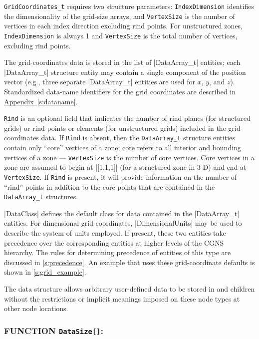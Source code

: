 \texttt{GridCoordinates\_t} requires two structure parameters:
\texttt{IndexDimension} identifies the dimensionality of the grid-size
arrays, and \texttt{VertexSize} is the number of vertices in each index
direction excluding rind points.
For unstructured zones, \texttt{IndexDimension} is always 1 and
\texttt{VertexSize} is the total number of vertices, excluding rind
points.

The grid-coordinates data is stored in the list of |DataArray_t| entities;
each |DataArray_t| structure entity may contain a single component of
the position vector (e.g., three separate |DataArray_t| entities are used
for $x$, $y$, and $z$).  
Standardized data-name identifiers for the grid coordinates are described
in \hyperref[s:dataname]{Appendix~\ref*{s:dataname}}.

\texttt{Rind} is an optional field that indicates the number of
rind planes (for structured grids) or rind points or elements (for
unstructured grids) included in the grid-coordinates data.
If \texttt{Rind} is absent, then the \texttt{DataArray\_t} structure
entities contain only ``core'' vertices of a zone; core refers to all
interior and bounding vertices of a zone --- \texttt{VertexSize} is the
number of core vertices.
Core vertices in a zone are assumed to begin at |[1,1,1]|
(for a structured zone in 3-D) and end at \texttt{VertexSize}.
If \texttt{Rind} is present, it will provide information on the number
of ``rind'' points in addition to the core points that are contained in
the \texttt{DataArray\_t} structures.

|DataClass| defines the default class for data contained in the
|DataArray_t| entities.
For dimensional grid coordinates, |DimensionalUnits| may be used to
describe the system of units employed.
If present, these two entities take precedence over the corresponding
entities at higher levels of the CGNS hierarchy.
The rules for determining precedence of entities of this type are
discussed in \autoref{s:precedence}.
An example that uses these grid-coordinate defaults is shown in
\autoref{s:grid_example}.

The  data structure allows arbitrary
user-defined data to be stored in  and
 children without the restrictions or implicit
meanings imposed on these node types at other node locations.

\enlargethispage{\baselineskip}
\subsubsection*{FUNCTION \texttt{DataSize[]}:}

